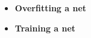 \begin{itemize}

  \item \textbf{Overfitting a net}
  
  \item \textbf{Training a net}

\end{itemize}
